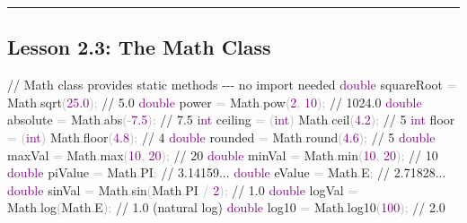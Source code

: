 \documentclass[
  justified,
  openright,
]{tufte-book}
\newcommand{\BuiltInTok}[1]{#1}
\newcommand{\CommentTok}[1]{\textcolor{MidGray}{#1}}
\newcommand{\DataTypeTok}[1]{\textcolor{Purple}{#1}}
\newcommand{\DecValTok}[1]{\textcolor{Purple}{#1}}
\newcommand{\FloatTok}[1]{\textcolor{Purple}{#1}}
\newcommand{\FunctionTok}[1]{\textcolor{BrandBlue}{#1}}
\newcommand{\NormalTok}[1]{#1}
\newcommand{\OperatorTok}[1]{\textcolor{DarkGray}{#1}}
\newenvironment{Shaded}{%
  \begin{snugshade}
}{%
  \end{snugshade}
}
\begin{document}
\begin{center}\rule{0.5\linewidth}{0.5pt}\end{center}

\subsection{Lesson 2.3: The Math Class}\label{lesson-2.3-the-math-class}

\begin{Shaded}
\begin{Highlighting}[]
\CommentTok{// Math class provides static methods {-}{-}{-} no import needed}
\DataTypeTok{double}\NormalTok{ squareRoot }\OperatorTok{=} \BuiltInTok{Math}\OperatorTok{.}\FunctionTok{sqrt}\OperatorTok{(}\FloatTok{25.0}\OperatorTok{);}     \CommentTok{// 5.0}
\DataTypeTok{double}\NormalTok{ power }\OperatorTok{=} \BuiltInTok{Math}\OperatorTok{.}\FunctionTok{pow}\OperatorTok{(}\DecValTok{2}\OperatorTok{,} \DecValTok{10}\OperatorTok{);}           \CommentTok{// 1024.0}
\DataTypeTok{double}\NormalTok{ absolute }\OperatorTok{=} \BuiltInTok{Math}\OperatorTok{.}\FunctionTok{abs}\OperatorTok{({-}}\FloatTok{7.5}\OperatorTok{);}         \CommentTok{// 7.5}
\DataTypeTok{int}\NormalTok{ ceiling }\OperatorTok{=} \OperatorTok{(}\DataTypeTok{int}\OperatorTok{)} \BuiltInTok{Math}\OperatorTok{.}\FunctionTok{ceil}\OperatorTok{(}\FloatTok{4.2}\OperatorTok{);}       \CommentTok{// 5}
\DataTypeTok{int}\NormalTok{ floor }\OperatorTok{=} \OperatorTok{(}\DataTypeTok{int}\OperatorTok{)} \BuiltInTok{Math}\OperatorTok{.}\FunctionTok{floor}\OperatorTok{(}\FloatTok{4.8}\OperatorTok{);}        \CommentTok{// 4}
\DataTypeTok{double}\NormalTok{ rounded }\OperatorTok{=} \BuiltInTok{Math}\OperatorTok{.}\FunctionTok{round}\OperatorTok{(}\FloatTok{4.6}\OperatorTok{);}         \CommentTok{// 5}
\DataTypeTok{double}\NormalTok{ maxVal }\OperatorTok{=} \BuiltInTok{Math}\OperatorTok{.}\FunctionTok{max}\OperatorTok{(}\DecValTok{10}\OperatorTok{,} \DecValTok{20}\OperatorTok{);}         \CommentTok{// 20}
\DataTypeTok{double}\NormalTok{ minVal }\OperatorTok{=} \BuiltInTok{Math}\OperatorTok{.}\FunctionTok{min}\OperatorTok{(}\DecValTok{10}\OperatorTok{,} \DecValTok{20}\OperatorTok{);}         \CommentTok{// 10}
\DataTypeTok{double}\NormalTok{ piValue }\OperatorTok{=} \BuiltInTok{Math}\OperatorTok{.}\FunctionTok{PI}\OperatorTok{;}                 \CommentTok{// 3.14159...}
\DataTypeTok{double}\NormalTok{ eValue }\OperatorTok{=} \BuiltInTok{Math}\OperatorTok{.}\FunctionTok{E}\OperatorTok{;}                   \CommentTok{// 2.71828...}
\DataTypeTok{double}\NormalTok{ sinVal }\OperatorTok{=} \BuiltInTok{Math}\OperatorTok{.}\FunctionTok{sin}\OperatorTok{(}\BuiltInTok{Math}\OperatorTok{.}\FunctionTok{PI} \OperatorTok{/} \DecValTok{2}\OperatorTok{);}   \CommentTok{// 1.0}
\DataTypeTok{double}\NormalTok{ logVal }\OperatorTok{=} \BuiltInTok{Math}\OperatorTok{.}\FunctionTok{log}\OperatorTok{(}\BuiltInTok{Math}\OperatorTok{.}\FunctionTok{E}\OperatorTok{);}        \CommentTok{// 1.0  (natural log)}
\DataTypeTok{double}\NormalTok{ log10 }\OperatorTok{=} \BuiltInTok{Math}\OperatorTok{.}\FunctionTok{log10}\OperatorTok{(}\DecValTok{100}\OperatorTok{);}          \CommentTok{// 2.0}
\end{Highlighting}
\end{Shaded}
\end{document}
